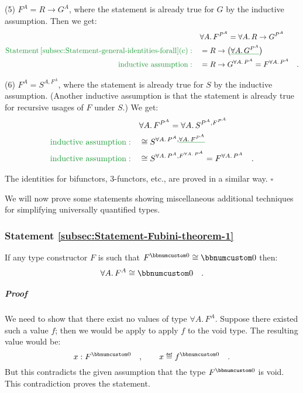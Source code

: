 (5) $F^{A}=R\rightarrow G^{A}$, where the statement is already true
for $G$ by the inductive assumption. Then we get:
\begin{align*}
 & \forall A.\,F^{P^{A}}=\forall A.\,R\rightarrow G^{P^{A}}\\
{\color{greenunder}\text{Statement\,\ref{subsec:Statement-general-identities-forall}(c)}:}\quad & =R\rightarrow\big(\gunderline{\forall A.\,G^{P^{A}}}\big)\\
{\color{greenunder}\text{inductive assumption}:}\quad & =R\rightarrow G^{\forall A.\,P^{A}}=F^{\forall A.\,P^{A}}\quad.
\end{align*}

(6) $F^{A}=S^{A,F^{A}}$, where the statement is already true for
$S$ by the inductive assumption. (Another inductive assumption is
that the statement is already true for recursive usages of $F$ under
$S$.) We get:
\begin{align*}
 & \forall A.\,F^{P^{A}}=\forall A.\,S^{P^{A},F^{P^{A}}}\\
{\color{greenunder}\text{inductive assumption}:}\quad & \cong S^{\forall A.\,P^{A},\gunderline{\forall A.\,F^{P^{A}}}}\\
{\color{greenunder}\text{inductive assumption}:}\quad & \cong S^{\forall A.\,P^{A},F^{\forall A.\,P^{A}}}=F^{\forall A.\,P^{A}}\quad.
\end{align*}

The identities for bifunctors, $3$-functors, etc., are proved in
a similar way. $\square$

We will now prove some statements showing miscellaneous additional
techniques for simplifying universally quantified types.

\subsubsection{Statement \label{subsec:Statement-Fubini-theorem-1}\ref{subsec:Statement-Fubini-theorem-1} }

If any type constructor $F$ is such that $F^{\bbnum 0}\cong\bbnum 0$
then:
\[
\forall A.\,F^{A}\cong\bbnum 0\quad.
\]


\subparagraph{Proof}

We need to show that there exist no values of type $\forall A.\,F^{A}$.
Suppose there existed such a value $f$; then we would be apply to
apply $f$ to the void type. The resulting value would be:
\[
x:F^{\bbnum 0}\quad,\quad\quad x\triangleq f^{\bbnum 0}\quad.
\]
But this contradicts the given assumption that the type $F^{\bbnum 0}$
is void. This contradiction proves the statement.

